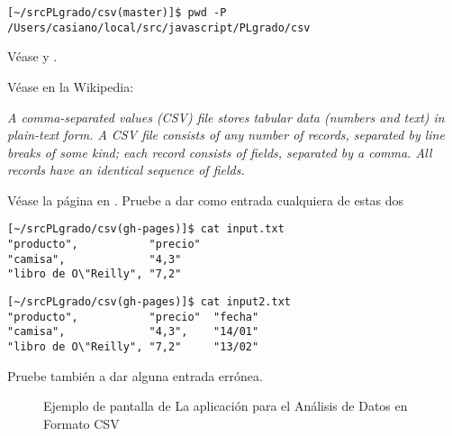



\label{sectionpractica:csv}


\begin{verbatim}
[~/srcPLgrado/csv(master)]$ pwd -P
/Users/casiano/local/src/javascript/PLgrado/csv\end{verbatim}

Véase
y
.


Véase  en la Wikipedia:

{\it A comma-separated values (CSV) file stores tabular data (numbers
and text) in plain-text form. 
 A CSV file consists of any number of
records, separated by line breaks of some kind; each record consists
of fields, separated by a comma. All records have an identical
sequence of fields.}


Véase la página en 
.
Pruebe a dar como entrada cualquiera de estas dos
\begin{verbatim}
[~/srcPLgrado/csv(gh-pages)]$ cat input.txt 
"producto",           "precio"
"camisa",             "4,3"
"libro de O\"Reilly", "7,2"
\end{verbatim}

\begin{verbatim}
[~/srcPLgrado/csv(gh-pages)]$ cat input2.txt 
"producto",           "precio"  "fecha"
"camisa",             "4,3",    "14/01"
"libro de O\"Reilly", "7,2"     "13/02"
\end{verbatim}

Pruebe también a dar alguna entrada errónea.

\begin{latexonly}
\begin{figure}[htb]
\begin{center}
\centerline{}
\end{center}
\label{figure:csv}
\caption{Ejemplo de pantalla de La aplicación para el Análisis de Datos en Formato CSV}
\end{figure}
\end{latexonly}

